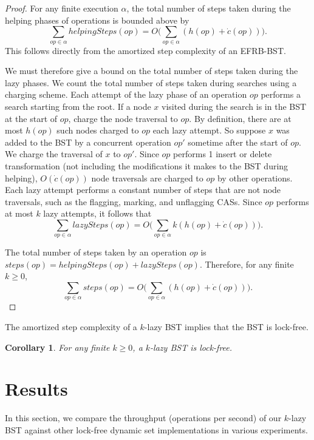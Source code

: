 \documentclass[letterpaper,twocolumn]{article}
\newtheorem{corollary}[theorem]{Corollary}
\begin{document}
\begin{proof}
For any finite execution $\alpha$, the total number of steps taken during the helping phases of operations is bounded above by
\begin{equation*}
\sum_{op\in\alpha} helpingSteps(op) = O\bigg(\sum_{op\in\alpha} (h(op) + \dot{c}(op))\bigg).
\end{equation*}
This follows directly from the amortized step complexity of an EFRB-BST. 

We must therefore give a bound on the total number of steps taken during the lazy phases. We count the total number of steps taken during searches using a charging scheme.  Each attempt of the lazy phase of an operation $op$ performs a search starting from the root. If a node $x$ visited during the search is in the BST at the start of $op$, charge the node traversal to $op$. By definition, there are at most $h(op)$ such nodes charged to $op$ each lazy attempt. So suppose $x$ was added to the BST by a concurrent operation $op'$ sometime after the start of $op$. We charge the traversal of $x$ to $op'$. Since $op$ performs 1 insert or delete transformation (not including the modifications it makes to the BST during helping), $O(\dot{c}(op))$ node traversals are charged to $op$ by other operations. Each lazy attempt performs a constant number of steps that are not node traversals, such as the flagging, marking, and unflagging CASs. Since $op$ performs at most $k$ lazy attempts, it follows that
\begin{equation*}
\sum_{op\in\alpha} lazySteps(op) = O\bigg(\sum_{op\in\alpha} k(h(op) + \dot{c}(op))\bigg).
\end{equation*}

The total number of steps taken by an operation $op$ is $steps(op) = helpingSteps(op) + lazySteps(op)$. Therefore, for any finite $k \geq 0$,
\begin{equation*}
\sum_{op\in\alpha} steps(op) = O\bigg(\sum_{op\in\alpha} (h(op) + \dot{c}(op))\bigg).
\end{equation*}
\end{proof}

The amortized step complexity of a $k$-lazy BST implies that the BST is lock-free.
\begin{corollary}
For any finite $k \geq 0$, a $k$-lazy BST is lock-free.
\end{corollary}

\section{Results}\label{section_results}
In this section, we compare the throughput (operations per second) of our $k$-lazy BST against other lock-free dynamic set implementations in various experiments.
\end{document}
